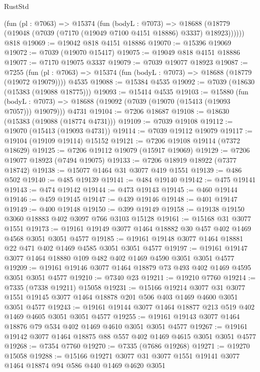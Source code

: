 \begin{lexlean}{RustStd}
\begin{coremodule}
      (fun (pl : @7063) =>
      @15374
        (fun (bodyL : @7073) =>
        @18688 (@18779 (@19048 (@7039 (@7170 (@19049 @7100 @4151 @18886) @3337) @18923))))))
    @818
@19069 := @19042 @818 @4151 @18886
@19070 := @15396 @19069
@19072 := @7039 (@19070 @15417)
@19075 := @19049 @818 @4151 @18886
@19077 := @7170 @19075 @3337
@19079 := @7039 @19077 @18923
@19087 := @7255
    (fun (pl : @7063) => @15374 (fun (bodyL : @7073) => @18688 (@18779 (@19072 @19079))))
    @4535
@19088 := @15384 @4535
@19092 := @7039 (@18630 (@15383 (@19088 @18775)))
@19093 := @15414 @4535
@19103 := @15880
    (fun (bodyL : @7073) => @18688 (@19092 (@7039 (@19070 (@15413 (@19093 @7057))) @19079)))
    @4731
@19104 := @7206 @18687
@19108 := @18630 (@15383 (@19088 (@18774 @4731)))
@19109 := @7039 @19108
@19112 := @19070 (@15413 (@19093 @4731))
@19114 := @7039 @19112 @19079
@19117 := @19104 (@19109 @19114) @15152
@19121 := @7206 @19108 @19114 (@7372 @18629)
@19125 := @7206 @19112 @19079 (@15917 @19069)
@19129 := @7206 @19077 @18923 (@7494 @19075)
@19133 := @7206 @18919 @18922 (@7377 @18742)
@19138 := @15077 @1464 @31 @3077 @419 @1551
@19139 := @486 @502
@19140 := @485 @19139
@19141 := @484 @19140
@19142 := @475 @19141
@19143 := @474 @19142
@19144 := @473 @19143
@19145 := @460 @19144
@19146 := @459 @19145
@19147 := @439 @19146
@19148 := @401 @19147
@19149 := @400 @19148
@19150 := @399 @19149
@19158 := @19138 @19150 @3060 @18883 @402 @3097 @766 @3103 @15128
@19161 := @15168 @31 @3077 @1551
@19173 := @19161 @19149 @3077 @1464 @18882 @30 @457 @402 @1469 @4568 @3051 @3051 @4577
@19185 := @19161 @19148 @3077 @1464 @18881 @22 @471 @402 @1469 @4585 @3051 @3051 @4577
@19197 := @19161 @19147 @3077 @1464 @18880 @109 @482 @402 @1469 @4590 @3051 @3051 @4577
@19209 := @19161 @19146 @3077 @1464 @18879 @73 @493 @402 @1469 @4595 @3051 @3051 @4577
@19210 := @7340 @23
@19211 := @19210 @7760
@19214 := @7335 (@7338 @19211) @15058
@19231 := @15166
    @19214
    @3077
    @31
    @3077
    @1551
    @19145
    @3077
    @1464
    @18878
    @201
    @506
    @403
    @1469
    @4600
    @3051
    @3051
    @4577
@19243 := @19161 @19144 @3077 @1464 @18877 @213 @519 @402 @1469 @4605 @3051 @3051 @4577
@19255 := @19161 @19143 @3077 @1464 @18876 @79 @534 @402 @1469 @4610 @3051 @3051 @4577
@19267 := @19161 @19142 @3077 @1464 @18875 @88 @557 @402 @1469 @4615 @3051 @3051 @4577
@19268 := @7354 @7760
@19270 := @7335 (@7686 @19268)
@19271 := @19270 @15058
@19288 := @15166
    @19271
    @3077
    @31
    @3077
    @1551
    @19141
    @3077
    @1464
    @18874
    @94
    @586
    @440
    @1469
    @4620
    @3051

\end{coremodule}
\end{lexlean}
